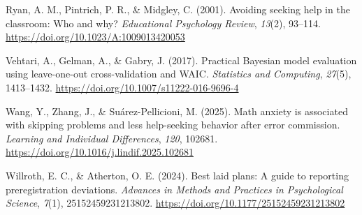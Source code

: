 \documentclass[
  man,
  floatsintext,
  longtable,
  nolmodern,
  notxfonts,
  notimes,
  colorlinks=true,linkcolor=blue,citecolor=blue,urlcolor=blue]{apa7}
\newlength{\cslhangindent}
\newenvironment{CSLReferences}[2] %
 {\begin{list}{}{%
  \setlength{\itemindent}{0pt}
  \setlength{\leftmargin}{0pt}
  \setlength{\parsep}{0pt}
  \ifodd #1
   \setlength{\leftmargin}{\cslhangindent}
   \setlength{\itemindent}{-1\cslhangindent}
  \fi
  \setlength{\itemsep}{#2\baselineskip}}}
 {\end{list}}
\begin{document}
\begin{CSLReferences}{1}{0}
Ryan, A. M., Pintrich, P. R., \& Midgley, C. (2001). Avoiding seeking
help in the classroom: Who and why? \emph{Educational Psychology
Review}, \emph{13}(2), 93--114.
\url{https://doi.org/10.1023/A:1009013420053}

Vehtari, A., Gelman, A., \& Gabry, J. (2017). Practical {Bayesian} model
evaluation using leave-one-out cross-validation and {WAIC}.
\emph{Statistics and Computing}, \emph{27}(5), 1413--1432.
\url{https://doi.org/10.1007/s11222-016-9696-4}

Wang, Y., Zhang, J., \& Suárez-Pellicioni, M. (2025). Math anxiety is
associated with skipping problems and less help-seeking behavior after
error commission. \emph{Learning and Individual Differences},
\emph{120}, 102681. \url{https://doi.org/10.1016/j.lindif.2025.102681}

Willroth, E. C., \& Atherton, O. E. (2024). Best laid plans: A guide to
reporting preregistration deviations. \emph{Advances in Methods and
Practices in Psychological Science}, \emph{7}(1), 25152459231213802.
\url{https://doi.org/10.1177/25152459231213802}

\end{CSLReferences}
\end{document}

